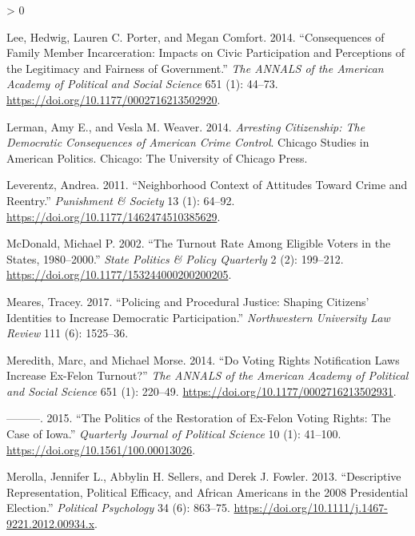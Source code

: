 \documentclass[
  12pt,
]{article}
\newlength{\cslhangindent}
\newenvironment{CSLReferences}[2] %
 {%
  \setlength{\parindent}{0pt}
  \ifodd #1 \everypar{\setlength{\hangindent}{\cslhangindent}}\ignorespaces\fi
  \ifnum #2 > 0
  \setlength{\parskip}{#2\baselineskip}
  \fi
 }%
 {}
\begin{document}
\begin{CSLReferences}{1}{0}
\leavevmode\hypertarget{ref-Lee2014}{}%
Lee, Hedwig, Lauren C. Porter, and Megan Comfort. 2014. {``Consequences of {Family Member Incarceration}: {Impacts} on {Civic Participation} and {Perceptions} of the {Legitimacy} and {Fairness} of {Government}.''} \emph{The ANNALS of the American Academy of Political and Social Science} 651 (1): 44--73. \url{https://doi.org/10.1177/0002716213502920}.

\leavevmode\hypertarget{ref-Lerman2014}{}%
Lerman, Amy E., and Vesla M. Weaver. 2014. \emph{Arresting Citizenship: The Democratic Consequences of {American} Crime Control}. Chicago Studies in {American} Politics. {Chicago}: {The University of Chicago Press}.

\leavevmode\hypertarget{ref-Leverentz2011}{}%
Leverentz, Andrea. 2011. {``Neighborhood Context of Attitudes Toward Crime and Reentry.''} \emph{Punishment \& Society} 13 (1): 64--92. \url{https://doi.org/10.1177/1462474510385629}.

\leavevmode\hypertarget{ref-McDonald2002}{}%
McDonald, Michael P. 2002. {``The {Turnout Rate} Among {Eligible Voters} in the {States}, 1980--2000.''} \emph{State Politics \& Policy Quarterly} 2 (2): 199--212. \url{https://doi.org/10.1177/153244000200200205}.

\leavevmode\hypertarget{ref-Meares2017}{}%
Meares, Tracey. 2017. {``Policing and {Procedural Justice}: {Shaping Citizens}' {Identities} to {Increase Democratic Participation}.''} \emph{Northwestern University Law Review} 111 (6): 1525--36.

\leavevmode\hypertarget{ref-Meredith2014}{}%
Meredith, Marc, and Michael Morse. 2014. {``Do {Voting Rights Notification Laws Increase Ex}-{Felon Turnout}?''} \emph{The ANNALS of the American Academy of Political and Social Science} 651 (1): 220--49. \url{https://doi.org/10.1177/0002716213502931}.

\leavevmode\hypertarget{ref-Meredith2015}{}%
---------. 2015. {``The {Politics} of the {Restoration} of {Ex}-{Felon Voting Rights}: {The Case} of {Iowa}.''} \emph{Quarterly Journal of Political Science} 10 (1): 41--100. \url{https://doi.org/10.1561/100.00013026}.

\leavevmode\hypertarget{ref-Merolla2013}{}%
Merolla, Jennifer L., Abbylin H. Sellers, and Derek J. Fowler. 2013. {``Descriptive {Representation}, {Political Efficacy}, and {African Americans} in the 2008 {Presidential Election}.''} \emph{Political Psychology} 34 (6): 863--75. \url{https://doi.org/10.1111/j.1467-9221.2012.00934.x}.


\end{CSLReferences}
\end{document}
